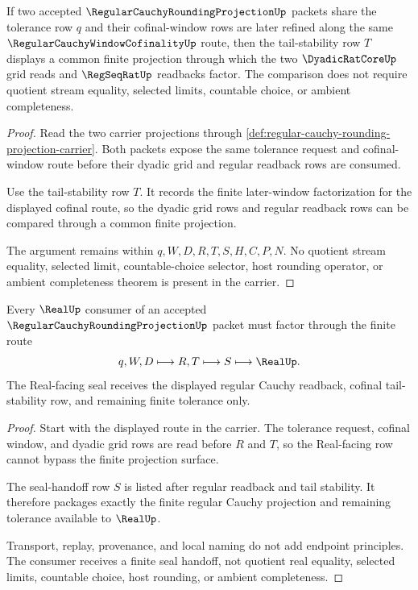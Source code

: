 \begin{theorem}
\label{thm:regular-cauchy-rounding-projection-cofinal-tail-stability}
If two accepted $\RegularCauchyRoundingProjectionUp$ packets share the tolerance row $q$ and their cofinal-window rows are later refined along the same $\RegularCauchyWindowCofinalityUp$ route, then the tail-stability row $T$ displays a common finite projection through which the two $\DyadicRatCoreUp$ grid reads and $\RegSeqRatUp$ readbacks factor. The comparison does not require quotient stream equality, selected limits, countable choice, or ambient completeness.
\end{theorem}
\begin{proof}
Read the two carrier projections through \autoref{def:regular-cauchy-rounding-projection-carrier}. Both packets expose the same tolerance request and cofinal-window route before their dyadic grid and regular readback rows are consumed.

Use the tail-stability row $T$. It records the finite later-window factorization for the displayed cofinal route, so the dyadic grid rows and regular readback rows can be compared through a common finite projection.

The argument remains within $q,W,D,R,T,S,H,C,P,N$. No quotient stream equality, selected limit, countable-choice selector, host rounding operator, or ambient completeness theorem is present in the carrier.
\end{proof}

\begin{theorem}
\label{thm:regular-cauchy-rounding-projection-real-seal-handoff}
Every $\RealUp$ consumer of an accepted $\RegularCauchyRoundingProjectionUp$ packet must factor through the finite route
$$
q,W,D \longmapsto R,T \longmapsto S \longmapsto \RealUp .
$$
The Real-facing seal receives the displayed regular Cauchy readback, cofinal tail-stability row, and remaining finite tolerance only.
\end{theorem}
\begin{proof}
Start with the displayed route in the carrier. The tolerance request, cofinal window, and dyadic grid rows are read before $R$ and $T$, so the Real-facing row cannot bypass the finite projection surface.

The seal-handoff row $S$ is listed after regular readback and tail stability. It therefore packages exactly the finite regular Cauchy projection and remaining tolerance available to $\RealUp$.

Transport, replay, provenance, and local naming do not add endpoint principles. The consumer receives a finite seal handoff, not quotient real equality, selected limits, countable choice, host rounding, or ambient completeness.
\end{proof}

